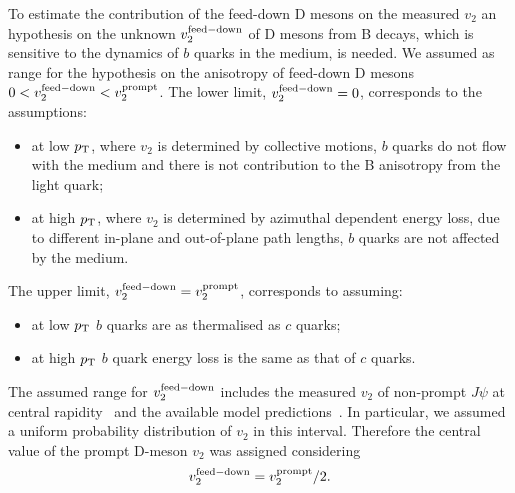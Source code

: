 To estimate the contribution of the feed-down D mesons on the measured $v_2$ 
an hypothesis on the unknown $v_2^{\rm feed-down}$ of D mesons from B decays, 
which is sensitive to the dynamics of $b$ quarks in the medium, is needed.
We assumed as range for the hypothesis on 
the anisotropy of feed-down D mesons $0<v_2^{\rm feed-down}<v_2^{\rm prompt}$.
The lower limit, $v_2^{\rm feed-down}=0$, corresponds to the assumptions:
\begin{itemize}
\item{at low $p_{\rm T}$, where $v_2$ is determined by collective motions, 
$b$ quarks do not flow with the medium and there is not contribution to 
the B anisotropy from the light quark;}
\item{at high $p_{\rm T}$, where $v_2$ is determined by azimuthal dependent 
energy loss, due to different in-plane and out-of-plane path lengths, 
$b$ quarks are not affected by the medium.}
\end{itemize}
The upper limit, $v_2^{\rm feed-down}=v_2^{\rm prompt}$, corresponds to assuming:
\begin{itemize}
\item{at low $p_{\rm T}$ $b$ quarks are as thermalised as $c$ quarks;}
\item{at high $p_{\rm T}$ $b$ quark energy loss is the same as that of $c$ quarks.}
\end{itemize}


The assumed range for $v_2^{\rm feed-down}$ includes the measured $v_2$ 
of non-prompt $J\psi$ at central rapidity~\cite{Khachatryan:2016ypw} and the available 
model predictions~\cite{Aichelin:2012ww,Uphoff:2012gb,Greco:2007sz,Aichelin:2012ww, Uphoff:2011ad, He:2012df}. 
In particular, we assumed a uniform probability distribution of $v_2$ in this interval. 
Therefore the central value of the prompt D-meson $v_2$ was assigned considering 
\begin{equation}
v_2^{\rm feed-down}=v_2^{\rm prompt}/2.
\end{equation}

